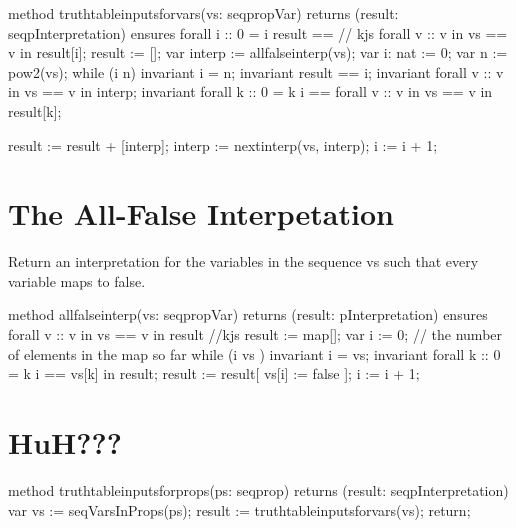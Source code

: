 \documentclass[letterpaper,10pt,english]{sphinxmanual}
\begin{document}
\begin{sphinxVerbatim}[commandchars=\\\{\}]
method truth\PYGZus{}table\PYGZus{}inputs\PYGZus{}for\PYGZus{}vars(vs: seq\PYGZlt{}propVar\PYGZgt{})
    returns (result: seq\PYGZlt{}pInterpretation\PYGZgt{})
    ensures forall i :: 0 \PYGZlt{}= i \PYGZlt{} \textbar{}result\textbar{} ==\PYGZgt{}   // kjs
        forall v :: v in vs ==\PYGZgt{} v in result[i];
\PYGZob{}
    result := [];
    var interp := all\PYGZus{}false\PYGZus{}interp(vs);
    var i: nat := 0;
    var n := pow2(\textbar{}vs\textbar{});
    while (i \PYGZlt{} n)
        invariant i \PYGZlt{}= n;
        invariant \textbar{}result\textbar{} == i;
        invariant forall v :: v in vs ==\PYGZgt{} v in interp;
        invariant
            forall k :: 0 \PYGZlt{}= k \PYGZlt{} i ==\PYGZgt{}
                forall v :: v in vs ==\PYGZgt{}
                    v in result[k];


    \PYGZob{}
        result := result + [interp];
        interp := next\PYGZus{}interp(vs, interp);
        i := i + 1;
    \PYGZcb{}
\PYGZcb{}
\end{sphinxVerbatim}


\section{The All-False Interpetation}
\label{\detokenize{12-satisfiability:the-all-false-interpetation}}
Return an interpretation for the variables in the sequence vs such
that every variable maps to false.

\begin{sphinxVerbatim}[commandchars=\\\{\}]
method all\PYGZus{}false\PYGZus{}interp(vs: seq\PYGZlt{}propVar\PYGZgt{})
    returns (result: pInterpretation)
    ensures forall v :: v in vs ==\PYGZgt{} v in result //kjs
\PYGZob{}
    result := map[];
    var i := 0; // the number of elements in the map so far
    while (i \PYGZlt{} \textbar{} vs \textbar{})
        invariant i \PYGZlt{}= \textbar{}vs\textbar{};
        invariant forall k :: 0 \PYGZlt{}= k \PYGZlt{} i ==\PYGZgt{} vs[k] in result;
    \PYGZob{}
        result := result[ vs[i] := false ];
        i := i + 1;
    \PYGZcb{}
\PYGZcb{}
\end{sphinxVerbatim}


\section{HuH???}
\label{\detokenize{12-satisfiability:huh}}
\begin{sphinxVerbatim}[commandchars=\\\{\}]
method truth\PYGZus{}table\PYGZus{}inputs\PYGZus{}for\PYGZus{}props(ps: seq\PYGZlt{}prop\PYGZgt{})
    returns (result: seq\PYGZlt{}pInterpretation\PYGZgt{})
\PYGZob{}
    var vs := seqVarsInProps(ps);
    result := truth\PYGZus{}table\PYGZus{}inputs\PYGZus{}for\PYGZus{}vars(vs);
    return;
\PYGZcb{}
\end{sphinxVerbatim}
\end{document}
